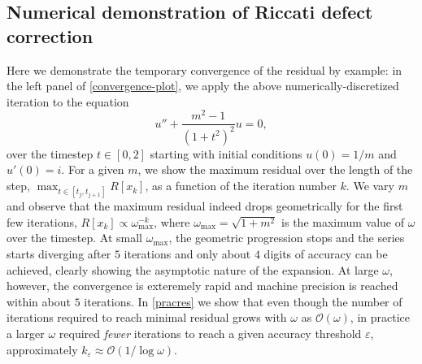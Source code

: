 \documentclass[10pt]{article}
\newcommand{\bigO}{{\mathcal O}}
\newcommand{\om}{\omega}
\begin{document}




\subsection{Numerical demonstration of Riccati defect correction}
\label{s:demo}

Here we demonstrate the temporary convergence of the residual by example: in the left panel of \cref{convergence-plot}, we apply
the above numerically-discretized iteration to the equation
\begin{equation}\label{bursteq}
    u'' + \frac{m^2 - 1}{(1+t^2)^2}u = 0,  
\end{equation}
over the timestep $t \in [0, 2]$ starting with initial conditions $u(0) = 1/m$ and
$u'(0) = i$. For a given $m$, we show the maximum residual over the length of
the step, $\max_{t \in [t_j, t_{j+1}]}R[x_k]$, as a function
of the iteration number $k$. We vary $m$ and observe that the maximum residual
indeed drops geometrically for the first few iterations, $R[x_k] \propto
\om_{\text{max}}^{-k}$, where $\om_{\text{max}} = \sqrt{1 + m^2}$ is the
maximum value of $\om$ over the timestep. At small $\om_{\text{max}}$, the
geometric progression stops and the series starts diverging after $5$
iterations and only about $4$ digits of accuracy can be achieved, clearly
showing the asymptotic nature of the expansion. At large $\om$, however, the
convergence is exteremely rapid and machine precision is reached within about
$5$ iterations. In \cref{pracres} we show that even though the number of iterations
required to reach minimal residual grows with $\om$ as $\bigO(\om)$, in
practice a larger $\om$ required \emph{fewer} iterations to reach a given
accuracy threshold $\varepsilon$, approximately $k_{\varepsilon} \approx
\bigO(1/\log\om)$.  
\end{document}
